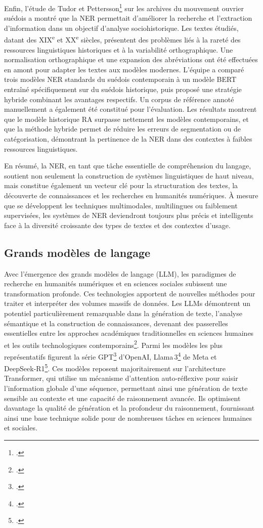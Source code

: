 \documentclass[a4paper,twoside,12pt]{book}
\begin{document}
Enfin, l'étude de Tudor et Pettersson\footcite{tudor2024} sur les archives du mouvement ouvrier suédois a montré que la NER permettait d'améliorer la recherche et l'extraction d'information dans un objectif d'analyse sociohistorique. Les textes étudiés, datant des XIX\textsuperscript{e} et XX\textsuperscript{e} siècles, présentent des problèmes liés à la rareté des ressources linguistiques historiques et à la variabilité orthographique. Une normalisation orthographique et une expansion des abréviations ont été effectuées en amont pour adapter les textes aux modèles modernes. L'équipe a comparé trois modèles NER standards du suédois contemporain à un modèle BERT entraîné spécifiquement sur du suédois historique, puis proposé une stratégie hybride combinant les avantages respectifs. Un corpus de référence annoté manuellement a également été constitué pour l'évaluation. Les résultats montrent que le modèle historique RA surpasse nettement les modèles contemporains, et que la méthode hybride permet de réduire les erreurs de segmentation ou de catégorisation, démontrant la pertinence de la NER dans des contextes à faibles ressources linguistiques.

En résumé, la NER, en tant que tâche essentielle de compréhension du langage, soutient non seulement la construction de systèmes linguistiques de haut niveau, mais constitue également un vecteur clé pour la structuration des textes, la découverte de connaissances et les recherches en humanités numériques. À mesure que se développent les techniques multimodales, multilingues ou faiblement supervisées, les systèmes de NER deviendront toujours plus précis et intelligents face à la diversité croissante des types de textes et des contextes d'usage.

\subsection{Grands modèles de langage}
Avec l'émergence des grands modèles de langage (LLM), les paradigmes de recherche en humanités numériques et en sciences sociales subissent une transformation profonde. Ces technologies apportent de nouvelles méthodes pour traiter et interpréter des volumes massifs de données. Les LLMs démontrent un potentiel particulièrement remarquable dans la génération de texte, l'analyse sémantique et la construction de connaissances, devenant des passerelles essentielles entre les approches académiques traditionnelles en sciences humaines et les outils technologiques contemporains\footcite{cigliano}. Parmi les modèles les plus représentatifs figurent la série GPT\footcite{yenduri2023} d'OpenAI, Llama 3\footcite{grattafiori2024} de Meta et DeepSeek‑R1\footcite{deepseek-ai2025}. Ces modèles reposent majoritairement sur l'architecture Transformer, qui utilise un mécanisme d'attention auto‑réflexive pour saisir l'information globale d'une séquence, permettant ainsi une génération de texte sensible au contexte et une capacité de raisonnement avancée. Ils optimisent davantage la qualité de génération et la profondeur du raisonnement, fournissant ainsi une base technique solide pour de nombreuses tâches en sciences humaines et sociales.
\end{document}
